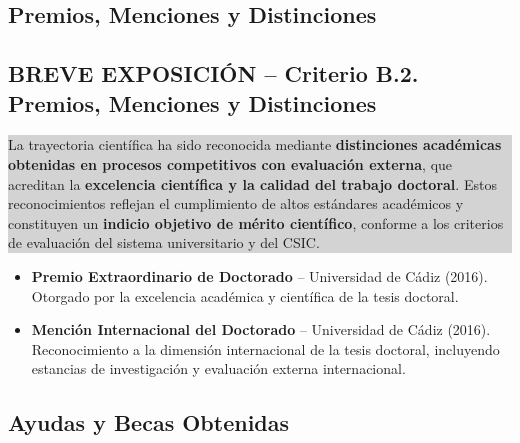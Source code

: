 \documentclass[11pt,a4paper]{article}
\newcommand{\breveexposicion}[2]{
    \subsection*{\color{darkgray}\textbf{BREVE EXPOSICIÓN -- #1}}
    \vspace{0.3em}
    \noindent\colorbox{lightgray}{%
        \begin{minipage}{0.97\textwidth}
        \vspace{0.5em}
        \color{darkgray}
        #2
        \vspace{0.5em}
        \end{minipage}
    }
    \vspace{1em}
}
\begin{document}
\subsection{Premios, Menciones y Distinciones}

\breveexposicion{Criterio B.2. Premios, Menciones y Distinciones}{
La trayectoria científica ha sido reconocida mediante \textbf{distinciones académicas obtenidas en procesos competitivos con evaluación externa}, que acreditan la \textbf{excelencia científica y la calidad del trabajo doctoral}. Estos reconocimientos reflejan el cumplimiento de altos estándares académicos y constituyen un \textbf{indicio objetivo de mérito científico}, conforme a los criterios de evaluación del sistema universitario y del CSIC.
}

\begin{itemize}[leftmargin=*]

    \item \textbf{Premio Extraordinario de Doctorado} -- Universidad de Cádiz (2016).\\
    Otorgado por la excelencia académica y científica de la tesis doctoral.

    \item \textbf{Mención Internacional del Doctorado} -- Universidad de Cádiz (2016).\\
    Reconocimiento a la dimensión internacional de la tesis doctoral, incluyendo estancias de investigación y evaluación externa internacional.
    
\end{itemize}

\subsection{Ayudas y Becas Obtenidas}
\end{document}
